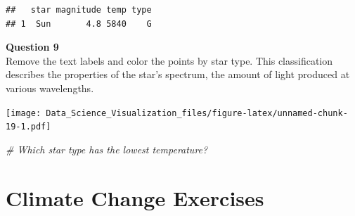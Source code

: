 \documentclass[
]{article}
\newenvironment{Shaded}{\begin{snugshade}}{\end{snugshade}}
\newcommand{\CommentTok}[1]{\textcolor[rgb]{0.56,0.35,0.01}{\textit{#1}}}
\newcommand{\DataTypeTok}[1]{\textcolor[rgb]{0.13,0.29,0.53}{#1}}
\newcommand{\KeywordTok}[1]{\textcolor[rgb]{0.13,0.29,0.53}{\textbf{#1}}}
\newcommand{\NormalTok}[1]{#1}
\newcommand{\OperatorTok}[1]{\textcolor[rgb]{0.81,0.36,0.00}{\textbf{#1}}}
\newcommand{\StringTok}[1]{\textcolor[rgb]{0.31,0.60,0.02}{#1}}
\begin{document}
\begin{Shaded}
\end{Shaded}

\begin{verbatim}
##   star magnitude temp type
## 1  Sun       4.8 5840    G
\end{verbatim}

\textbf{Question 9}\\
Remove the text labels and color the points by star type. This
classification describes the properties of the star's spectrum, the
amount of light produced at various wavelengths.

\begin{Shaded}
\end{Shaded}

\texttt{[image: Data\_Science\_Visualization\_files/figure-latex/unnamed-chunk-19-1.pdf]}

\begin{Shaded}
\begin{Highlighting}[]
\CommentTok{# Which star type has the lowest temperature?}
\end{Highlighting}
\end{Shaded}

\hypertarget{climate-change-exercises}{%
\section{Climate Change Exercises}\label{climate-change-exercises}}
\end{document}
